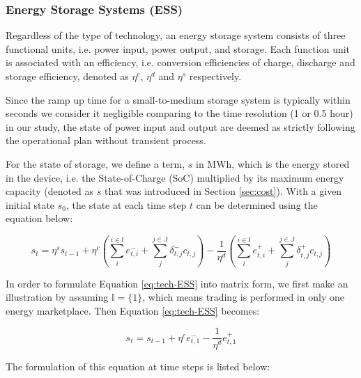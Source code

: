 \subsubsection{Energy Storage Systems (ESS)}
Regardless of the type of technology, an energy storage system consists of three functional units, i.e. power input, power output, and storage. Each function unit is associated with an efficiency, i.e. conversion efficiencies of charge, discharge and storage efficiency, denoted as $\eta^c$, $\eta^d$ and $\eta^s$ respectively.

Since the ramp up time for a small-to-medium storage system is typically within seconds \cite{Muller2016} we consider it negligible comparing to the time resolution (1 or 0.5 hour) in our study, the state of power input and output are deemed as strictly following the operational plan without transient process.

For the state of storage, we define a term, $s$ in MWh, which is the energy stored in the device, i.e. the State-of-Charge (SoC) multiplied by its maximum energy capacity (denoted as $\overline{s}$ that was introduced in Section \ref{sec:cost}). With a given initial state $s_0$, the state at each time step $t$ can be determined using the equation below:

\begin{equation}
\label{eq:tech-ESS}
s_t = \eta^s s_{t-1} + \eta^c (\sum_{i}^{i \in \mathbb{I}} e_{t,i}^{-} + \sum_{j}^{j \in \mathbb{J}}\delta_{t,j}^{-} c_{t,j})- \frac{1}{\eta^d} (\sum_{i}^{i \in \mathbb{I}} e_{t,i}^{+} + \sum_{j}^{j \in \mathbb{J}}\delta_{t,j}^{+}c_{t,j})
\end{equation}



In order to formulate Equation \eqref{eq:tech-ESS} into matrix form, we first make an illustration by assuming $\mathbb{I} = \{1\}$, which means trading is performed in only one energy marketplace. Then Equation \eqref{eq:tech-ESS} becomes:

\begin{equation}
\label{eq:tech-ESS-example}
s_t = s_{t-1} + \eta^c e_{t,1}^{-}  - \frac{1}{\eta^d} e_{t,1}^{+}
\end{equation}

The formulation of this equation at time steps is listed below:

